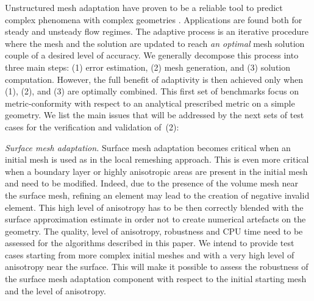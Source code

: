 \documentclass[3p,times,procedia,number]{elsarticle}
\begin{document}
Unstructured mesh adaptation have proven to be a reliable tool to predict complex phenomena  with complex geometries \cite{park-carlson-turbulent-output-adapt-aiaa,michal-krakos-aniso-adapt-edge}.
Applications are found both for steady and unsteady flow regimes. The adaptive process is an iterative procedure where  the mesh and
the solution are updated to reach {\it an optimal} mesh solution couple of a desired level of accuracy. We generally decompose this process
into three main steps:  (1) error estimation, (2) mesh generation, and (3) solution computation.
%
However, the full benefit of adaptivity is then achieved only when (1), (2), and (3) are optimally combined.
This first set of benchmarks focus on metric-conformity with respect to an analytical prescribed
metric on a simple geometry.
We list the main issues that will be addressed by the next sets of test cases  for the verification and validation of~(2):

\emph{Surface mesh adaptation.\;}
Surface mesh adaptation becomes critical when an initial mesh is used as in the local remeshing approach.
This is even more critical when a boundary layer or highly anisotropic areas  are present in the initial mesh and need to be modified.
Indeed, due to the presence of the volume mesh near the surface mesh, refining an element may lead to the creation
{\color{blue}of negative invalid element}.  
This high level of anisotropy has to be then correctly blended
with the  surface approximation estimate in order not to create numerical artefacts on the geometry.
The quality, level of anisotropy, robustness and CPU time need to be assessed  for the  algorithms described in this paper.
We intend to provide test cases  starting from more complex initial meshes and with a very high level of anisotropy
near the surface. This will make it possible to assess the robustness of the surface mesh adaptation component with respect to the initial starting mesh
and the level of anisotropy.
\end{document}
